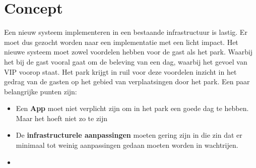 \chapter{Concept}\label{ch:concept}
Een nieuw systeem implementeren in een bestaande infrastructuur is lastig.
Er moet dus gezocht worden naar een implementatie met een licht impact. Het nieuwe systeem moet zowel voordelen hebben voor de gast als het park. Waarbij het bij de gast vooral gaat om de beleving van een dag, waarbij het gevoel van VIP voorop staat. Het park krijgt in ruil voor deze voordelen inzicht in het gedrag van de gasten op het gebied van verplaatsingen door het park.
Een paar belangrijke punten zijn:
\begin{itemize}
    \item Een \textbf{App} moet niet verplicht zijn om in het park een goede dag te hebben. Maar het hoeft niet zo te zijn 
    \item De \textbf{infrastructurele aanpassingen} moeten gering zijn in die zin dat er minimaal tot weinig aanpassingen gedaan moeten worden in wachtrijen.
    \item
\end{itemize}
